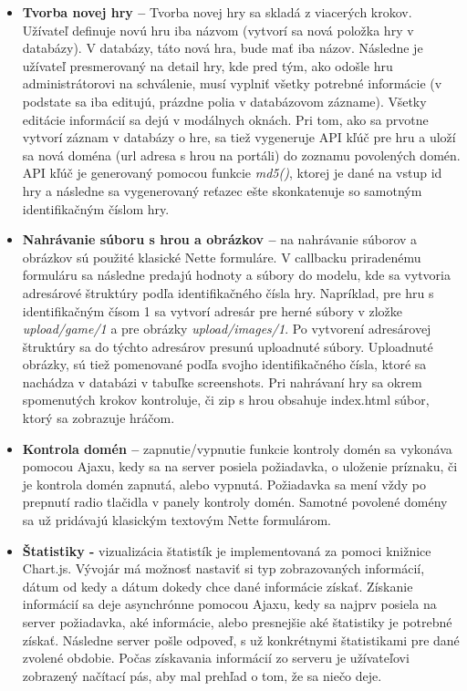 \begin{itemize}  
\item \textbf{Tvorba novej hry –} Tvorba novej hry sa skladá z viacerých krokov. Užívateľ definuje novú hru iba názvom (vytvorí sa nová položka hry v databázy). V databázy, táto nová hra, bude mať iba názov. Následne je užívateľ presmerovaný na detail hry, kde pred tým, ako odošle hru administrátorovi na schválenie, musí vyplniť všetky potrebné informácie (v podstate sa iba editujú, prázdne polia v databázovom zázname). Všetky editácie informácií sa dejú v modálnych oknách. Pri tom, ako sa prvotne vytvorí záznam v databázy o hre, sa tiež vygeneruje API kľúč pre hru a uloží sa nová doména (url adresa s hrou na portáli) do zoznamu povolených domén. API kľúč je generovaný pomocou funkcie \textit{md5()}, ktorej je dané na vstup id hry a následne sa vygenerovaný reťazec ešte skonkatenuje so samotným identifikačným číslom hry.  
\item \textbf{Nahrávanie súboru s hrou a obrázkov –} na nahrávanie súborov a obrázkov sú použité klasické Nette formuláre. V callbacku priradenému formuláru sa následne predajú hodnoty a súbory do modelu, kde sa vytvoria adresárové štruktúry podľa identifikačného čísla hry. Napríklad, pre hru s identifikačným čísom 1 sa vytvorí adresár pre herné súbory v zložke \textit{upload/game/1} a pre obrázky \textit{upload/images/1}. Po vytvorení adresárovej štruktúry sa do týchto adresárov presunú uploadnuté súbory. Uploadnuté obrázky, sú tiež pomenované podľa svojho identifikačného čísla, ktoré sa nachádza v databázi v tabuľke screenshots. Pri nahrávaní hry sa okrem spomenutých krokov kontroluje, či zip s hrou obsahuje index.html súbor, ktorý sa zobrazuje hráčom. 
\item \textbf{Kontrola domén –} zapnutie/vypnutie funkcie kontroly domén sa vykonáva pomocou Ajaxu, kedy sa na server posiela požiadavka, o uloženie príznaku, či je kontrola domén zapnutá, alebo vypnutá. Požiadavka sa mení vždy po prepnutí radio tlačidla v panely kontroly domén. Samotné povolené domény sa už pridávajú klasickým textovým Nette formulárom.  
\item \textbf{Štatistiky -} vizualizácia štatistík je implementovaná za pomoci knižnice Chart.js. Vývojár má možnosť nastaviť si typ zobrazovaných informácií, dátum od kedy a dátum dokedy chce dané informácie získať. Získanie informácií sa deje asynchrónne pomocou Ajaxu, kedy sa najprv posiela na server požiadavka, aké informácie, alebo presnejšie aké štatistiky je potrebné získať. Následne server pošle odpoveď, s už konkrétnymi štatistikami pre dané zvolené obdobie. Počas získavania informácií zo serveru je užívateľovi zobrazený načítací pás, aby mal prehľad o tom, že sa niečo deje. 

\end{itemize}
